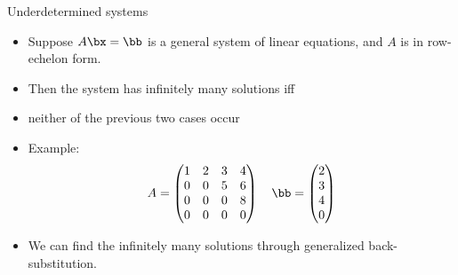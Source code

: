 \documentclass{beamer}
\begin{document}
\begin{frame}{Underdetermined systems}

\begin{itemize}
\item Suppose $A\bx=\bb$ is a general system of linear equations, and $A$ is in row-echelon form.
\item Then the system has infinitely many solutions iff
\item neither of the previous two cases occur
\item Example:
$$
A =
\begin{pmatrix}
1 & 2 & 3 & 4 \\
0 & 0 & 5 & 6 \\
0 & 0 & 0 & 8 \\
0 & 0 & 0 & 0 \\
\end{pmatrix}
\quad
\bb=
\begin{pmatrix}
2 \\ 3 \\ 4 \\ 0
\end{pmatrix}
$$
\item We can find the infinitely many solutions through generalized back-substitution.

\end{itemize}
\end{frame}
\end{document}
